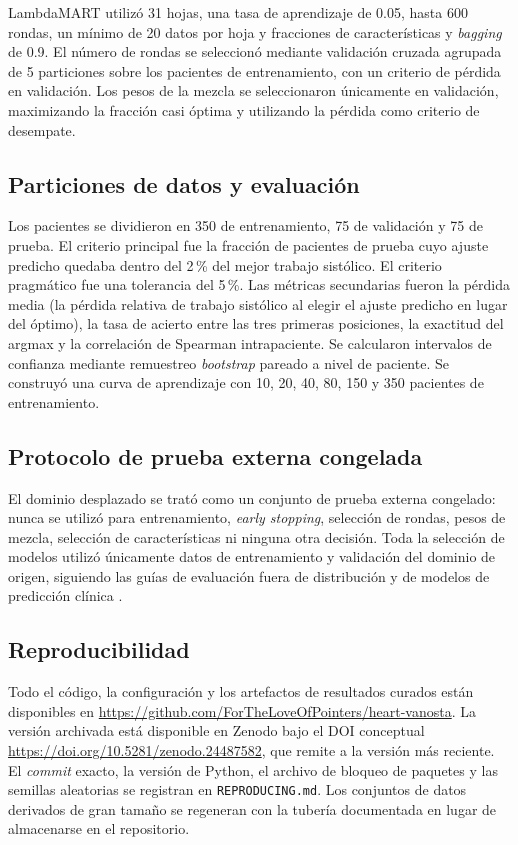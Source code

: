 \documentclass[11pt,a4paper]{article}
\begin{document}
LambdaMART utilizó 31 hojas, una tasa de aprendizaje de 0.05, hasta 600 rondas,
un mínimo de 20 datos por hoja y fracciones de características y
\emph{bagging} de 0.9. El número de rondas se seleccionó mediante validación
cruzada agrupada de 5 particiones sobre los pacientes de entrenamiento, con un
criterio de pérdida en validación. Los pesos de la mezcla se seleccionaron
únicamente en validación, maximizando la fracción casi óptima y utilizando la
pérdida como criterio de desempate.

\subsection{Particiones de datos y evaluación}

Los pacientes se dividieron en 350 de entrenamiento, 75 de validación y 75 de
prueba. El criterio principal fue la fracción de pacientes de prueba cuyo ajuste
predicho quedaba dentro del 2\,\% del mejor trabajo sistólico. El criterio
pragmático fue una tolerancia del 5\,\%. Las métricas secundarias fueron la
pérdida media (la pérdida relativa de trabajo sistólico al elegir el ajuste
predicho en lugar del óptimo), la tasa de acierto entre las tres primeras posiciones, la exactitud del
argmax y la correlación de Spearman intrapaciente. Se calcularon intervalos de
confianza mediante remuestreo \emph{bootstrap} pareado a nivel de paciente. Se construyó una
curva de aprendizaje con 10, 20, 40, 80, 150 y 350 pacientes de entrenamiento.

\subsection{Protocolo de prueba externa congelada}

El dominio desplazado se trató como un conjunto de prueba externa congelado:
nunca se utilizó para entrenamiento, \emph{early stopping}, selección de rondas,
pesos de mezcla, selección de características ni ninguna otra decisión. Toda la
selección de modelos utilizó únicamente datos de entrenamiento y validación del
dominio de origen, siguiendo las guías de evaluación fuera de distribución y de
modelos de predicción clínica \citep{koh2021,gulrajani2021,collins2024}.

\subsection{Reproducibilidad}

Todo el código, la configuración y los artefactos de resultados curados están
disponibles en \url{https://github.com/ForTheLoveOfPointers/heart-vanosta}. La
versión archivada está disponible en Zenodo bajo el DOI conceptual
\url{https://doi.org/10.5281/zenodo.24487582}, que remite a la versión más
reciente. El \emph{commit} exacto, la versión de Python, el archivo de bloqueo de
paquetes y las semillas aleatorias se registran en \texttt{REPRODUCING.md}. Los
conjuntos de datos derivados de gran tamaño se regeneran con la tubería
documentada en lugar de almacenarse en el repositorio.
\end{document}
